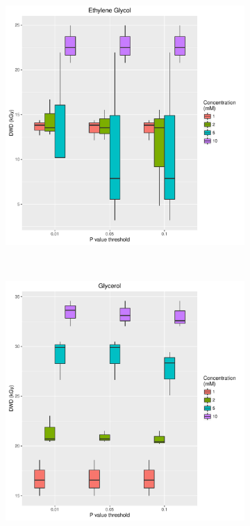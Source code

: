 \begin{figure}
\begin{subfigure}[b]{0.75\textwidth}
            \caption{}
            \label{}
    \end{subfigure}
\end{figure}
\begin{figure}
    \ContinuedFloat
    \centering
    \begin{subfigure}[b]{0.75\textwidth}
            \centering
            \includegraphics[width=\textwidth]{figures/saxs/Ethylene_Glycol_PThresh_comp.pdf}
            \caption{}
            \label{}
    \end{subfigure}
    \\
    \begin{subfigure}[b]{0.75\textwidth}
            \centering
            \includegraphics[width=\textwidth]{figures/saxs/Glycerol_PThresh_comp.pdf}

\end{subfigure}
\end{figure}

